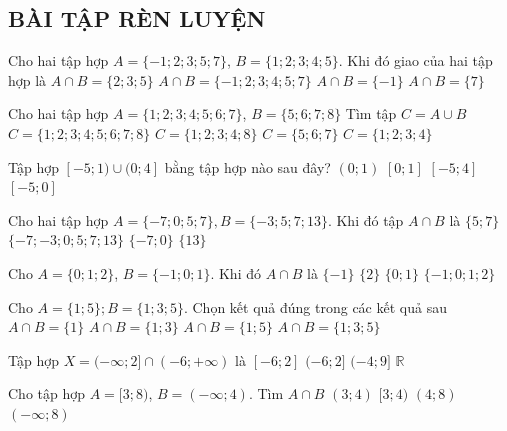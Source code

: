 \subsection{BÀI TẬP RÈN LUYỆN}
\caulc
\begin{ex}%
	Cho hai tập hợp $A=\{-1;2;3;5;7\}$, $B=\{1;2;3;4;5\}$. Khi đó giao của hai tập hợp là
	\choice
	{\True $A\cap B=\{2;3;5\}$}
	{$A\cap B=\{-1;2;3;4;5;7\}$}
	{$A\cap B=\{-1\}$}
	{$A\cap B=\{7\}$}
\end{ex}
\begin{ex}%
	Cho hai tập hợp ${A=\{1;2;3;4;5;6;7\}}$, $B=\{5;6;7;8\}$ Tìm tập $C=A\cup B$
	\choice
	{\True $C=\{1;2;3;4;5;6;7;8\}$}
	{$C=\{1;2;3;4;8\}$}
	{$C=\{5;6;7\}$}
	{$C=\{1;2;3;4\}$}
\end{ex}
\begin{ex}%
	Tập hợp $[-5;1)\cup (0;4]$ bằng tập hợp nào sau đây?
	\choice
	{$(0;1)$}
	{$[0;1]$}
	{\True $[-5;4]$}
	{$[-5;0]$}
\end{ex}
\begin{ex}%
	Cho hai tập hợp $A=\{-7;0;5;7\},B=\{-3;5;7;13\}$. Khi đó tập $A\cap B$ là
	\choice
	{\True $\{5;7\}$}
	{$\{-7;-3;0;5;7;13\}$}
	{$\{-7;0\}$}
	{$\{13\}$}
\end{ex}
\begin{ex}%
	Cho $A=\{0;1;2\}$, $B=\{-1;0;1\}$. Khi đó $A\cap B$ là
	\choice
	{$\{-1\}$}
	{$\{2\}$}
	{\True $\{0;1\}$}
	{$\{-1;0;1;2\}$}
\end{ex}
\begin{ex}%
	Cho $A=\{1;5\};B=\{1;3;5\}$. Chọn kết quả đúng trong các kết quả sau
	\choice
	{$A\cap B=\{1\}$}
	{$A\cap B=\{1;3\}$}
	{\True $A\cap B=\{1;5\}$}
	{$A\cap B=\{1;3;5\}$}
\end{ex}
\begin{ex}%
	Tập hợp $X=(-\infty;2]\cap (-6;+\infty)$ là
	\choice
	{$[-6;2]$}
	{\True $(-6;2]$}
	{$(-4;9]$}
	{$\mathbb{R}$}
	\loigiai{
		Ta có $X=(-6;2]$.}
\end{ex}
\begin{ex}%
	Cho tập hợp $A=[3;8)$, $B=(-\infty;4)$. Tìm $A\cap B$
	\choice
	{$(3;4)$}
	{\True $[3;4)$}
	{$(4;8)$}
	{$(-\infty;8)$}
	\loigiai{
		$A\cap B=[3;4)$.}
\end{ex}
